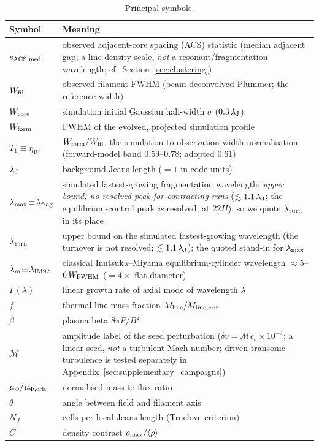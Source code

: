 \documentclass[usenatbib,twoside,twocolumn]{mnras}
\begin{document}
\begin{table}
\caption{Principal symbols.}
\label{tab:symbols}
\footnotesize
\setlength{\tabcolsep}{4pt}
\begin{tabular}{lp{6.1cm}}
\toprule
Symbol & Meaning \\
\midrule
$s_{\rm ACS,med}$ & observed adjacent-core spacing (ACS) statistic (median adjacent gap; a line-density scale, \emph{not} a resonant/fragmentation wavelength; cf.\ Section~\ref{sec:clustering}) \\
$W_{\rm fil}$ & observed filament FWHM (beam-deconvolved Plummer; the reference width) \\
$W_{\rm core}$ & simulation initial Gaussian half-width $\sigma$ ($0.3\,\lambda_{\rm J}$) \\
$W_{\rm form}$ & FWHM of the evolved, projected simulation profile \\
$T_1\!\equiv\!\eta_W$ & $W_{\rm form}/W_{\rm fil}$, the simulation-to-observation width normalisation (forward-model band $0.59$--$0.78$; adopted $0.61$) \\
$\lambda_{\rm J}$ & background Jeans length ($=1$ in code units) \\
$\lambda_{\rm max}\!\equiv\!\lambda_{\rm frag}$ & simulated fastest-growing fragmentation wavelength; \emph{upper bound; no resolved peak for contracting runs} ($\lesssim1.1\,\lambda_{\rm J}$; the equilibrium-control peak \emph{is} resolved, at $22H$), so we quote $\lambda_{\rm turn}$ in its place \\
$\lambda_{\rm turn}$ & upper bound on the simulated fastest-growing wavelength (the turnover is not resolved; $\lesssim1.1\,\lambda_{\rm J}$); the quoted stand-in for $\lambda_{\rm max}$ \\
$\lambda_{\rm m}\!\equiv\!\lambda_{\rm IM92}$ & classical Inutsuka--Miyama equilibrium-cylinder wavelength $\approx5$--$6\,W_{\rm FWHM}$ ($=4\times$ flat diameter) \\
$\Gamma(\lambda)$ & linear growth rate of axial mode of wavelength $\lambda$ \\
$f$ & thermal line-mass fraction $M_{\rm line}/M_{\rm line,crit}$ \\
$\beta$ & plasma beta $8\pi P/B^2$ \\
$\mathcal{M}$ & amplitude label of the seed perturbation ($\delta v=\mathcal{M}c_s\times10^{-4}$; a linear seed, \emph{not} a turbulent Mach number; driven transonic turbulence is tested separately in Appendix~\ref{sec:supplementary_campaigns}) \\
$\mu_\Phi/\mu_{\Phi,\rm crit}$ & normalised mass-to-flux ratio \\
$\theta$ & angle between field and filament axis \\
$N_J$ & cells per local Jeans length (Truelove criterion) \\
$C$ & density contrast $\rho_{\rm max}/\langle\rho\rangle$ \\
\bottomrule
\end{tabular}
\end{table}
\end{document}
